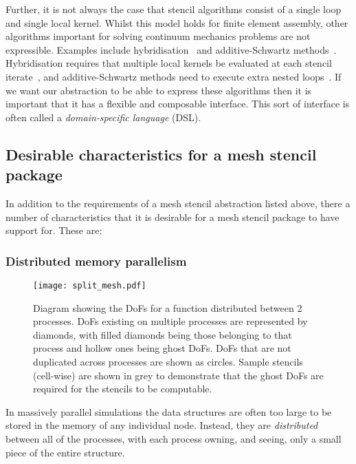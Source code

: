 \documentclass[thesis]{subfiles}
\begin{document}
Further, it is not always the case that stencil algorithms consist of a single loop and single local kernel.
Whilst this model holds for finite element assembly, other algorithms important for solving continuum mechanics problems are not expressible.
Examples include hybridisation~\cite{arnoldMixedNonconformingFinite1985,boffi2013mixed} and additive-Schwartz methods~\cite{arnoldPRECONDITIONINGDivAPPLICATIONS1997}.
Hybridisation requires that multiple local kernels be evaluated at each stencil iterate~\cite{gibsonSlateExtendingFiredrake2020}, and additive-Schwartz methods need to execute extra nested loops~\cite{farrellPCPATCHSoftwareTopological2021}.
If we want our abstraction to be able to express these algorithms then it is important that it has a flexible and composable interface.
This sort of interface is often called a \emph{domain-specific language} (DSL).

\subsection{Desirable characteristics for a mesh stencil package}
\label{sec:intro_desirable_traits}

In addition to the requirements of a mesh stencil abstraction listed above, there a number of characteristics that it is desirable for a mesh stencil package to have support for.
These are:

\subsubsection{Distributed memory parallelism}
\label{sec:intro_parallelism}

\begin{figure}
  \centering
  \texttt{[image: split\_mesh.pdf]}
  \caption{
    Diagram showing the DoFs for a function distributed between 2 processes.
    DoFs existing on multiple processes are represented by diamonds, with filled diamonds being those belonging to that process and hollow ones being ghost DoFs.
    DoFs that are not duplicated across processes are shown as circles.
    Sample stencils (cell-wise) are shown in grey to demonstrate that the ghost DoFs are required for the stencils to be computable.
  }
  \label{fig:pyop2_split_mesh}
\end{figure}

In massively parallel simulations the data structures are often too large to be stored in the memory of any individual node.
Instead, they are \emph{distributed} between all of the processes, with each process owning, and seeing, only a small piece of the entire structure.
\end{document}
